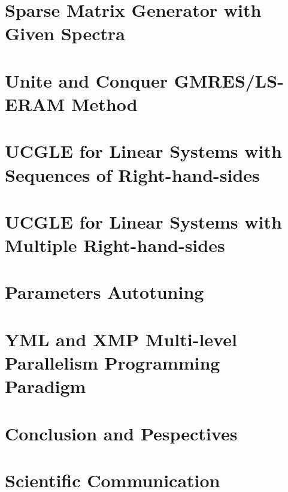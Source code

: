 \documentclass{xinzhewu}
\begin{document}


\chapter{Sparse Matrix Generator with Given Spectra}



\chapter[Unite and Conquer GMRES/LS-ERAM Method]{Unite and Conquer GMRES/LS-ERAM Method}



\chapter{UCGLE for Linear Systems with Sequences of Right-hand-sides}



\chapter{UCGLE for Linear Systems with Multiple Right-hand-sides}



\chapter{Parameters Autotuning}



\chapter{YML and XMP Multi-level Parallelism Programming Paradigm}



\chapter*{Conclusion and Pespectives}



\chapter*{Scientific Communication}




\clearemptydoublepage
\end{document}

